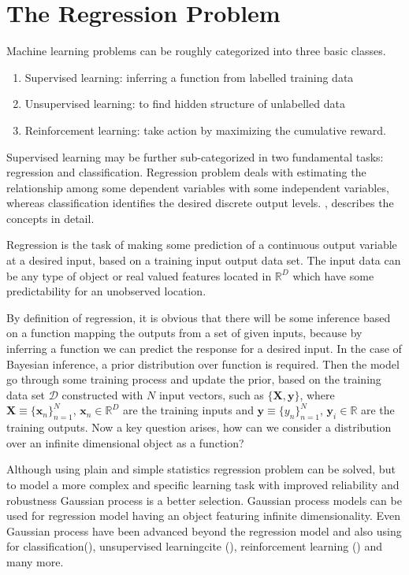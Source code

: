 
\section{The Regression Problem}
Machine learning problems can be roughly categorized into three basic classes. 
\begin{enumerate}
 \item Supervised learning: inferring a function from labelled training data
 \item Unsupervised learning: to find hidden structure of unlabelled data 
 \item Reinforcement learning: take action by maximizing the cumulative reward. 
\end{enumerate}
Supervised learning may be further sub-categorized in two fundamental tasks: regression and classification. Regression problem deals with estimating the relationship among some dependent variables with some independent variables, whereas classification identifies the desired discrete output levels. \cite{MacKay:2003}, \cite{Bishop:2006} describes the concepts in detail.

Regression is the task of making some prediction of a continuous output variable at a desired input, based on a training input output data set. The input data can be any type of object or real valued features located in $\mathbb{R}^D$ which have some predictability for an unobserved location. 

By definition of regression, it is obvious that there will be some inference based on a function mapping the outputs from a set of given inputs, because by inferring a function we can predict the response for a desired input. In the case of Bayesian inference, a prior distribution over function is required. Then the model go through some training process and update the prior, based on the training data set $\mathcal{D}$ constructed with $N$ input vectors, such as $\{\textbf{X},\textbf{y}\}$, 
where $\textbf{X}\equiv{\{{\textbf{x}_n}\}_{n=1}^N}$, $ \textbf{x}_n\in\mathbb{R}^D $ 
are the training inputs and 
$\textbf{y}\equiv{\{{y_n}\}_{n=1}^N}$, $ \textbf{y}_i\in\mathbb{R}$
are the training outputs. Now a key question arises, how can we consider a distribution over an infinite dimensional object as a function?

Although using plain and simple statistics regression problem can be solved, but to model a more complex and specific learning task with improved reliability and robustness Gaussian process is a better selection. Gaussian process models can be used for regression model having an object featuring infinite dimensionality. Even Gaussian process have been advanced beyond the regression model and also using for classification(\cite{Williams:1998, Nickisch:2008}), unsupervised learningcite (\cite{Ek:2008}), reinforcement learning (\cite{Deisenroth:2012}) and many more.

